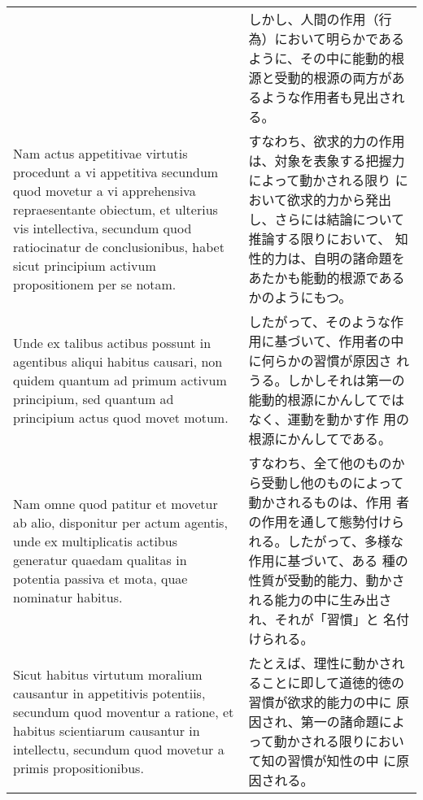 \documentclass[10pt]{jsarticle} %
\begin{document}
\begin{longtable}{p{21em}p{21em}}
&

しかし、人間の作用（行為）において明らかであるように、その中に能動的根
源と受動的根源の両方があるような作用者も見出される。

\\

Nam actus appetitivae virtutis procedunt a vi appetitiva secundum quod
movetur a vi apprehensiva repraesentante obiectum, et ulterius vis
intellectiva, secundum quod ratiocinatur de conclusionibus, habet
sicut principium activum propositionem per se notam.

&

すなわち、欲求的力の作用は、対象を表象する把握力によって動かされる限り
において欲求的力から発出し、さらには結論について推論する限りにおいて、
知性的力は、自明の諸命題をあたかも能動的根源であるかのようにもつ。

\\


Unde ex talibus actibus possunt in agentibus aliqui habitus causari,
non quidem quantum ad primum activum principium, sed quantum ad
principium actus quod movet motum.


&

したがって、そのような作用に基づいて、作用者の中に何らかの習慣が原因さ
れうる。しかしそれは第一の能動的根源にかんしてではなく、運動を動かす作
用の根源にかんしてである。

\\

Nam omne quod patitur et movetur ab alio, disponitur per actum
agentis, unde ex multiplicatis actibus generatur quaedam qualitas in
potentia passiva et mota, quae nominatur habitus.


&

すなわち、全て他のものから受動し他のものによって動かされるものは、作用
者の作用を通して態勢付けられる。したがって、多様な作用に基づいて、ある
種の性質が受動的能力、動かされる能力の中に生み出され、それが「習慣」と
名付けられる。

\\

Sicut habitus virtutum moralium causantur in appetitivis potentiis,
secundum quod moventur a ratione, et habitus scientiarum causantur in
intellectu, secundum quod movetur a primis propositionibus.

&

たとえば、理性に動かされることに即して道徳的徳の習慣が欲求的能力の中に
原因され、第一の諸命題によって動かされる限りにおいて知の習慣が知性の中
に原因される。


\end{longtable}
\end{document}
